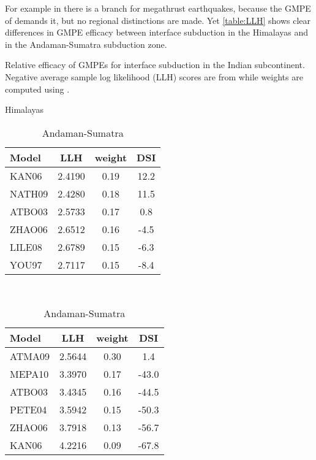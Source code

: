 \documentclass{article}
\begin{document}
\begin{appendices}
For example in \citet[Figure~3]{nath2012probabilistic} there is a branch for megathrust earthquakes, because the GMPE of \cite{atkinson2009predicted} demands it, but no regional distinctions are made. 
Yet \autoref{table:LLH} shows clear differences in GMPE efficacy between interface subduction in the Himalayas and in the Andaman-Sumatra subduction zone.

\begin{table}[!htb]
\centering
\caption[Relative efficacy of GMPEs for interface subduction.]{Relative efficacy of GMPEs for interface subduction in the Indian subcontinent.
Negative average sample log likelihood (LLH) scores are from \cite[Table 5]{nath2011peak} while weights are computed using \cite{delavaud2012testing}.}
\label{table:LLH}
\begin{subtable}[b]{0.45\textwidth}
\caption{Himalayas}
\centering
\begin{tabular}{lccc}
\toprule
   Model &     LLH &  weight &   DSI \\
\midrule
   KAN06 &  2.4190 &    0.19 &  12.2 \\
  NATH09 &  2.4280 &    0.18 &  11.5 \\
  ATBO03 &  2.5733 &    0.17 &   0.8 \\
  ZHAO06 &  2.6512 &    0.16 &  -4.5 \\
  LILE08 &  2.6789 &    0.15 &  -6.3 \\
   YOU97 &  2.7117 &    0.15 &  -8.4 \\
\bottomrule
\end{tabular}
\end{subtable}
~
\begin{subtable}[b]{0.45\textwidth}
\caption{Andaman-Sumatra}
\centering
\begin{tabular}{lccc}
\toprule
   Model &     LLH &  weight &   DSI \\
\midrule
  ATMA09 &  2.5644 &    0.30 &   1.4 \\
  MEPA10 &  3.3970 &    0.17 & -43.0 \\
  ATBO03 &  3.4345 &    0.16 & -44.5 \\
  PETE04 &  3.5942 &    0.15 & -50.3 \\
  ZHAO06 &  3.7918 &    0.13 & -56.7 \\
   KAN06 &  4.2216 &    0.09 & -67.8 \\
\bottomrule
\end{tabular}
\end{subtable}
\end{table}


\end{appendices}
\end{document}
